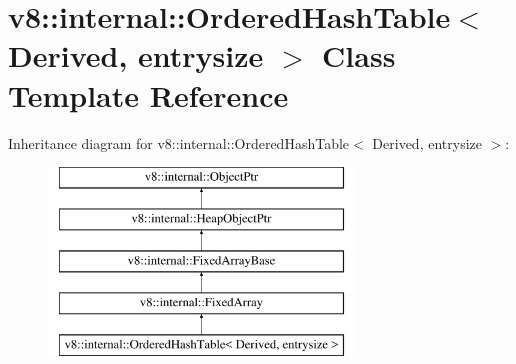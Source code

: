 \hypertarget{classv8_1_1internal_1_1OrderedHashTable}{}\section{v8\+:\+:internal\+:\+:Ordered\+Hash\+Table$<$ Derived, entrysize $>$ Class Template Reference}
\label{classv8_1_1internal_1_1OrderedHashTable}
Inheritance diagram for v8\+:\+:internal\+:\+:Ordered\+Hash\+Table$<$ Derived, entrysize $>$\+:\begin{figure}[H]
\begin{center}
\leavevmode
\includegraphics[height=5.000000cm]{classv8_1_1internal_1_1OrderedHashTable}
\end{center}
\end{figure}
